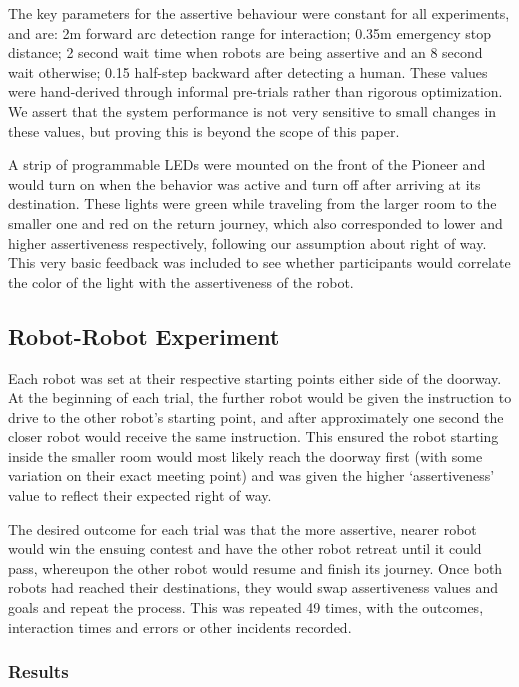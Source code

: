 \documentclass[letterpaper, 10 pt, conference]{ieeeconf}  %
\begin{document}
The key parameters for the assertive behaviour were constant for all experiments, and are: 2m forward arc detection range for interaction; 0.35m emergency stop distance; 2 second wait time when robots are being assertive and an 8 second wait otherwise; 0.15 half-step backward after detecting a human. These values were hand-derived through informal pre-trials rather than rigorous optimization. We assert that the system performance is not very sensitive to small changes in these values, but proving this is beyond the scope of this paper. 

A strip of programmable LEDs were mounted on the front of the Pioneer and would turn on when the behavior was active and turn off after arriving at its destination. These lights were green while traveling from the larger room to the smaller one and red on the return journey, which also corresponded to lower and higher assertiveness respectively, following our assumption about right of way. This very basic feedback was included to see whether participants would correlate the color of the light with the assertiveness of the robot.

\subsection{Robot-Robot Experiment}

Each robot was set at their respective starting points either side of the doorway. At the beginning of each trial, the further robot would be given the instruction to drive to the other robot’s starting point, and after approximately one second the closer robot would receive the same instruction. This ensured the robot starting inside the smaller room would most likely reach the doorway first (with some variation on their exact meeting point) and was given the higher `assertiveness' value to reflect their expected right of way.

The desired outcome for each trial was that the more assertive, nearer robot would win the ensuing contest and have the other robot retreat until it could pass, whereupon the other robot would resume and finish its journey. Once both robots had reached their destinations, they would swap assertiveness values and goals and repeat the process. This was repeated 49 times, with the outcomes, interaction times and errors or other incidents recorded. 

\subsubsection{Results}
\end{document}

